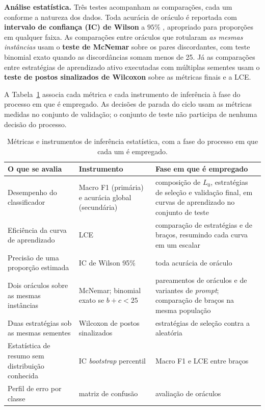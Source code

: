 \textbf{Análise estatística.} Três testes acompanham as comparações, cada um
conforme a natureza dos dados. Toda acurácia de oráculo é reportada com
\textbf{intervalo de confiança (IC) de Wilson} a $95\%$ \citep{Wilson1927},
apropriado para proporções em qualquer faixa. As comparações entre oráculos que
rotularam \emph{as mesmas instâncias} usam o \textbf{teste de McNemar}
\citep{McNemar1947} sobre os pares discordantes, com teste binomial exato quando
as discordâncias somam menos de 25. Já as comparações entre estratégias de
aprendizado ativo executadas com múltiplas sementes usam o \textbf{teste de
postos sinalizados de Wilcoxon} \citep{Wilcoxon1945} sobre as métricas finais e a
LCE.

A Tabela~\ref{tab:metricas-mapa} associa cada métrica e cada instrumento de
inferência à fase do processo em que é empregado. As decisões de parada do
ciclo usam as métricas medidas no conjunto de validação; o conjunto de
teste não participa de nenhuma decisão do processo.

\begin{table}[htb]
\centering
\caption{Métricas e instrumentos de inferência estatística, com a fase do
processo em que cada um é empregado.}
\label{tab:metricas-mapa}
\small
\begin{tabular}{p{} p{} p{}}
\toprule
\textbf{O que se avalia} & \textbf{Instrumento} & \textbf{Fase em que é empregado} \\
\midrule
Desempenho do classificador & Macro F1 (primária) e acurácia global
(secundária) & composição de $L_0$, estratégias de seleção e validação
final, em curvas de aprendizado no conjunto de teste \\
Eficiência da curva de aprendizado & LCE & comparação de estratégias e de
braços, resumindo cada curva em um escalar \\
Precisão de uma proporção estimada & IC de Wilson 95\% & toda acurácia de
oráculo \\
Dois oráculos sobre as mesmas instâncias & McNemar; binomial exato se
$b{+}c{<}25$ & pareamentos de oráculos e de variantes de \textit{prompt};
comparação de braços na mesma população \\
Duas estratégias sob as mesmas sementes & Wilcoxon de postos sinalizados &
estratégias de seleção contra a aleatória \\
Estatística de resumo sem distribuição conhecida & IC \textit{bootstrap}
percentil & Macro F1 e LCE entre braços \\
Perfil de erro por classe & matriz de confusão & avaliação de oráculos \\
\bottomrule
\end{tabular}
\end{table}


